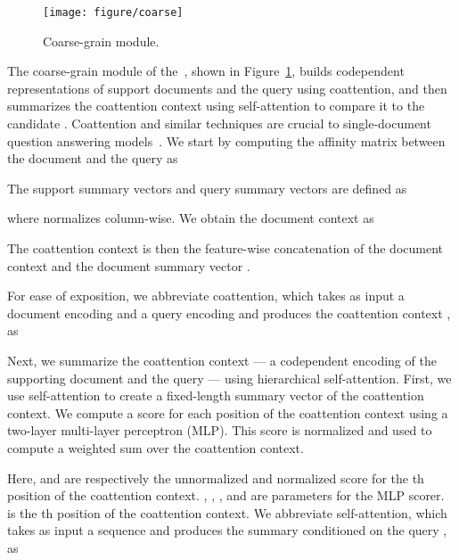 \documentclass{article} \usepackage{iclr2019_conference,times}
\begin{document}
\begin{figure}[t]
    \centering
    \texttt{[image: figure/coarse]}
    \caption{Coarse-grain module.}
    \label{fig:coarse}
    \vspace{-0.5cm}
\end{figure}

The coarse-grain module of the~\modelnameshort, shown in Figure~\ref{fig:coarse}, builds codependent representations of support documents  and the query  using coattention, and then summarizes the coattention context using self-attention to compare it to the candidate .
Coattention and similar techniques are crucial to single-document question answering models~\citep{xiong2016dynamic,Wang2016MachineCU,Seo2016BidirectionalAF}.
We start by computing the affinity matrix between the document and the query as



The support summary vectors and query summary vectors are defined as



where  normalizes  column-wise.
We obtain the document context as



The coattention context is then the feature-wise concatenation of the document context  and the document summary vector .



For ease of exposition, we abbreviate coattention, which takes as input a document encoding  and a query encoding  and produces the coattention context , as



Next, we summarize the coattention context --- a codependent encoding of the supporting document and the query --- using hierarchical self-attention.
First, we use self-attention to create a fixed-length summary vector of the coattention context.
We compute a score for each position of the coattention context using a two-layer multi-layer perceptron (MLP).
This score is normalized and used to compute a weighted sum over the coattention context.



Here,  and  are respectively the unnormalized and normalized score for the th position of the coattention context.
, , , and  are parameters for the MLP scorer.
 is the th position of the coattention context.
We abbreviate self-attention, which takes as input a sequence  and produces the summary conditioned on the query , as
\end{document}
